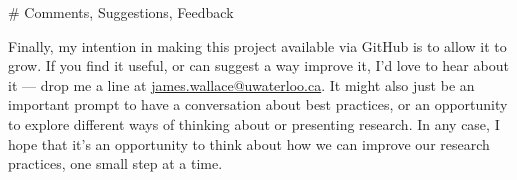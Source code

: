 \begin{markdown}
# Comments, Suggestions, Feedback

Finally, my intention in making this project available via GitHub is to allow it to grow. If you find it useful, or can suggest a way improve it, I'd love to hear about it --- drop me a line at \href{mailto:james.wallace@uwaterloo.ca}{james.wallace@uwaterloo.ca}. It might also just be an important prompt to have a conversation about best practices, or an opportunity to explore different ways of thinking about or presenting research. In any case, I hope that it's an opportunity to think about how we can improve our research practices, one small step at a time. 

\end{markdown}




